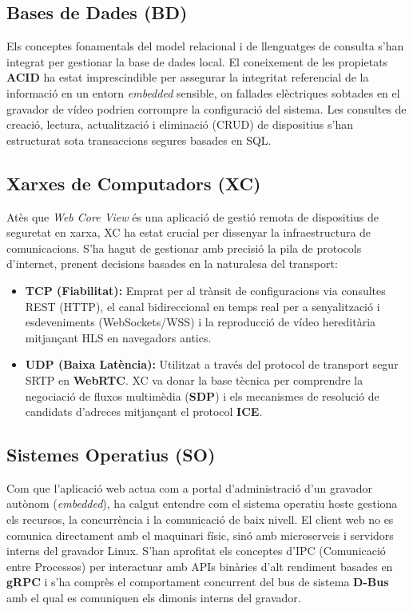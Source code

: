 \subsection{Bases de Dades (BD)}
Els conceptes fonamentals del model relacional i de llenguatges de consulta s'han integrat per gestionar la base de dades local. El coneixement de les propietats \textbf{ACID} ha estat imprescindible per assegurar la integritat referencial de la informació en un entorn \textit{embedded} sensible, on fallades elèctriques sobtades en el gravador de vídeo podrien corrompre la configuració del sistema. Les consultes de creació, lectura, actualització i eliminació (CRUD) de dispositius s'han estructurat sota transaccions segures basades en SQL.

\subsection{Xarxes de Computadors (XC)}
Atès que \textit{Web Core View} és una aplicació de gestió remota de dispositius de seguretat en xarxa, XC ha estat crucial per dissenyar la infraestructura de comunicacions. S'ha hagut de gestionar amb precisió la pila de protocols d'internet, prenent decisions basades en la naturalesa del transport:
\begin{itemize}
  \item \textbf{TCP (Fiabilitat):} Emprat per al trànsit de configuracions via consultes REST (HTTP), el canal bidireccional en temps real per a senyalització i esdeveniments (WebSockets/WSS) i la reproducció de vídeo hereditària mitjançant HLS en navegadors antics.
  \item \textbf{UDP (Baixa Latència):} Utilitzat a través del protocol de transport segur SRTP en \textbf{WebRTC}. XC va donar la base tècnica per comprendre la negociació de fluxos multimèdia (\textbf{SDP}) i els mecanismes de resolució de candidats d'adreces mitjançant el protocol \textbf{ICE}.
\end{itemize}

\subsection{Sistemes Operatius (SO)}
Com que l'aplicació web actua com a portal d'administració d'un gravador autònom (\textit{embedded}), ha calgut entendre com el sistema operatiu hoste gestiona els recursos, la concurrència i la comunicació de baix nivell. El client web no es comunica directament amb el maquinari físic, sinó amb microserveis i servidors interns del gravador Linux. S'han aprofitat els conceptes d'IPC (Comunicació entre Processos) per interactuar amb APIs binàries d'alt rendiment basades en \textbf{gRPC} i s'ha comprès el comportament concurrent del bus de sistema \textbf{D-Bus} amb el qual es comuniquen els dimonis interns del gravador.

